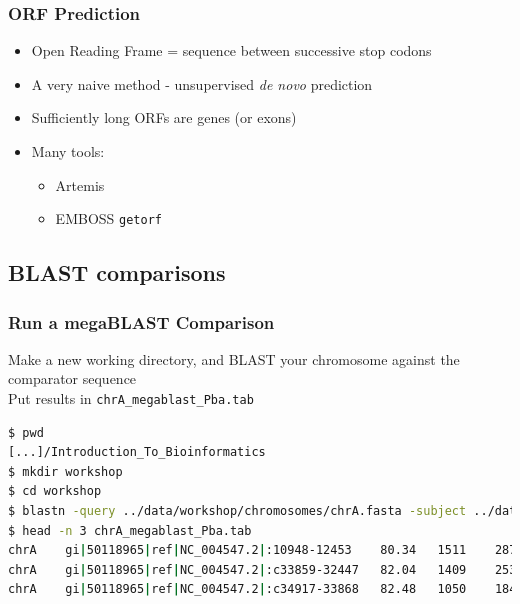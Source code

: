 \documentclass[table]{beamer}
\begin{document}
    \begin{frame}
     \frametitle{ORF Prediction}
     \begin{itemize}
       \item Open Reading Frame = sequence between successive stop codons
       \item A very naive method - unsupervised \textit{de novo} prediction
       \item Sufficiently long ORFs are genes (or exons)
       \item Many tools:
       \begin{itemize}
         \item Artemis
         \item EMBOSS \texttt{getorf}
       \end{itemize}
     \end{itemize}
    \end{frame}  




  \subsection{BLAST comparisons}
  \begin{frame}[fragile]
    \frametitle{Run a megaBLAST Comparison}
    Make a new working directory, and BLAST your chromosome against the comparator sequence \\
    Put results in \texttt{chrA\_megablast\_Pba.tab}
    \begin{lstlisting}[language=bash]
$ pwd
[...]/Introduction_To_Bioinformatics
$ mkdir workshop
$ cd workshop
$ blastn -query ../data/workshop/chromosomes/chrA.fasta -subject ../data/workshop/chromosomes/NC_004547.ffn -out chrA_megablast_Pba.tab -outfmt 6 
$ head -n 3 chrA_megablast_Pba.tab 
chrA	gi|50118965|ref|NC_004547.2|:10948-12453	80.34	1511	287	10	4579450	4580955	1506	1	0.0	1136
chrA	gi|50118965|ref|NC_004547.2|:c33859-32447	82.04	1409	253	0	4563151	4564559	1	1409	0.0	1201
chrA	gi|50118965|ref|NC_004547.2|:c34917-33868	82.48	1050	184	0	4562093	4563142	1	1050	0.0	 920
    \end{lstlisting}
\end{frame} 
    
\end{document}
